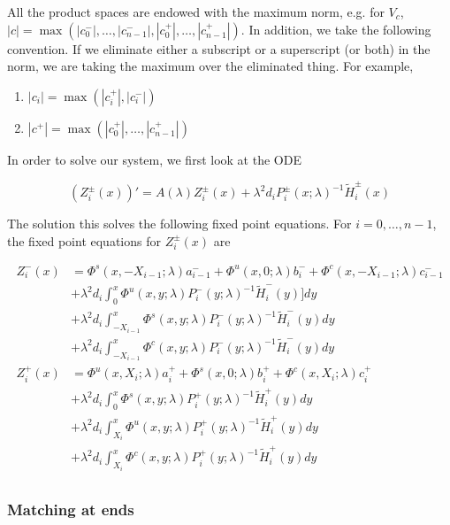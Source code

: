 \documentclass[12pt]{article}
\begin{document}
All the product spaces are endowed with the maximum norm, e.g. for $V_c$, $|c| = \max(|c_0^-|, \dots, |c_{n-1}^-|, |c_0^+|, \dots, |c_{n-1}^+|)$. In addition, we take the following convention. If we eliminate either a subscript or a superscript (or both) in the norm, we are taking the maximum over the eliminated thing. For example,

\begin{enumerate}
	\item $|c_i| = \max(|c_i^+|, |c_i^-|)$ 
	\item $|c^+| = \max(|c_0^+|, \dots, |c_{n-1}^+|)$
\end{enumerate}

In order to solve our system, we first look at the ODE

\[
(Z_i^\pm(x))' = A(\lambda) Z_i^\pm(x) + \lambda^2 d_i P_i^\pm(x; \lambda)^{-1} \tilde{H}_i^\pm(x)
\]

The solution this solves the following fixed point equations. For $i = 0, \dots, n-1$, the fixed point equations for $Z_i^\pm(x)$ are

\begin{align*}
Z_i^-(x) &= \Phi^s(x, -X_{i-1}; \lambda) a_{i-1}^- + \Phi^u(x, 0; \lambda) b_i^- + \Phi^c(x, -X_{i-1}; \lambda) c_{i-1}^- \\
&+ \lambda^2 d_i \int_0^x \Phi^u(x, y; \lambda) P_i^-(y; \lambda)^{-1} \tilde{H}_i^-(y)] dy \\
&+ \lambda^2 d_i \int_{-X_{i-1}}^x \Phi^s(x, y; \lambda) P_i^-(y; \lambda)^{-1} \tilde{H}_i^-(y) dy \\
&+ \lambda^2 d_i \int_{-X_{i-1}}^x \Phi^c(x, y; \lambda) P_i^-(y; \lambda)^{-1} \tilde{H}_i^-(y) dy  \\ 
Z_i^+(x) &= \Phi^u(x, X_i; \lambda) a_i^+ + \Phi^s(x, 0; \lambda) b_i^+ + \Phi^c(x, X_i; \lambda) c_i^+ \\
&+ \lambda^2 d_i \int_0^x \Phi^s(x, y; \lambda) P_i^+(y; \lambda)^{-1} \tilde{H}_i^+(y) dy \\
&+ \lambda^2 d_i \int_{X_i}^x \Phi^u(x, y; \lambda) P_i^+(y; \lambda)^{-1} \tilde{H}_i^+(y) dy \\
&+ \lambda^2 d_i \int_{X_i}^x \Phi^c(x, y; \lambda) P_i^+(y; \lambda)^{-1} \tilde{H}_i^+(y) dy \\
\end{align*}


\subsubsection{Matching at ends}
\end{document}
